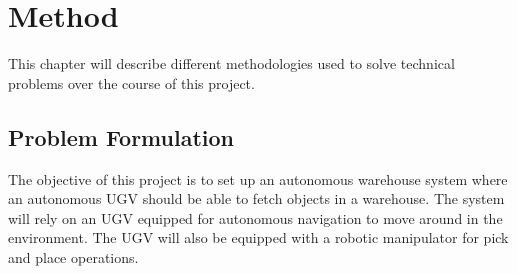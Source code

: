 \chapter{Method}




This chapter will describe different methodologies used to solve technical problems over the course of this project.

\section{Problem Formulation}

The objective of this project is to set up an autonomous warehouse system where an autonomous UGV should be able to fetch objects in a warehouse. The system will rely on an UGV equipped for autonomous navigation to move around in the environment. The UGV will also be equipped with a robotic manipulator for pick and place operations.

